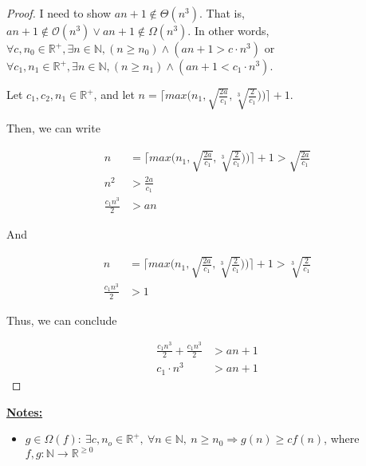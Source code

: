 \documentclass[12pt]{article}
\begin{document}
\begin{enumerate}[1.]
\begin{proof}
        \bigskip

        I need to show $an+1 \notin \Theta(n^3)$. That is, $an + 1 \notin \mathcal{O}(n^3) \lor an+1 \notin \Omega(n^3)$.
        In other words, $\forall c, n_0 \in \mathbb{R}^+, \exists n \in \mathbb{N}, (n \geq n_0) \land (an+1 > c \cdot n^3)$ or
        $\forall c_1, n_1 \in \mathbb{R}^+, \exists n \in \mathbb{N}, (n \geq n_1) \land (an+1 < c_1 \cdot n^3)$.

        \bigskip

        Let $c_1, c_2, n_1 \in \mathbb{R}^+$, and let $n = \bigl\lceil max\bigl( n_1, \sqrt{\frac{2a}{c_1}}, \sqrt[3]{\frac{2}{c_1}}) \bigr) \bigr\rceil + 1$.

        \bigskip

        Then, we can write

        \begin{align}
            n &= \bigl\lceil max\bigl( n_1, \sqrt{\frac{2a}{c_1}}, \sqrt[3]{\frac{2}{c_1}}) \bigr) \bigr\rceil + 1 > \sqrt{\frac{2a}{c_1}}\\
            n^2 &> \frac{2a}{c_1}\\
            \frac{c_1 n^3}{2} &> an
        \end{align}

        \bigskip

        And

        \begin{align}
            n &= \bigl\lceil max\bigl( n_1, \sqrt{\frac{2a}{c_1}}, \sqrt[3]{\frac{2}{c_1}}) \bigr) \bigr\rceil + 1 > \sqrt[3]{\frac{2}{c_1}}\\
            \frac{c_1n^3}{2} &> 1
        \end{align}

        \bigskip

        Thus, we can conclude

        \begin{align}
            \frac{c_1n^3}{2} + \frac{c_1n^3}{2} &> an + 1\\
            c_1 \cdot n^3 &> an + 1
        \end{align}
    \end{proof}

    \bigskip

        \underline{\textbf{Notes:}}

        \bigskip

        \begin{itemize}
            \item
            $g \in \Omega(f):\:\exists c,n_o \in \mathbb{R}^{+},\:\forall n \in
            \mathbb{N},\:n \geq n_0 \Rightarrow g(n) \geq cf(n)$, where $f,g:\mathbb{N} \to \mathbb{R}^{\geq 0}$


\end{itemize}
\end{enumerate}
\end{document}
